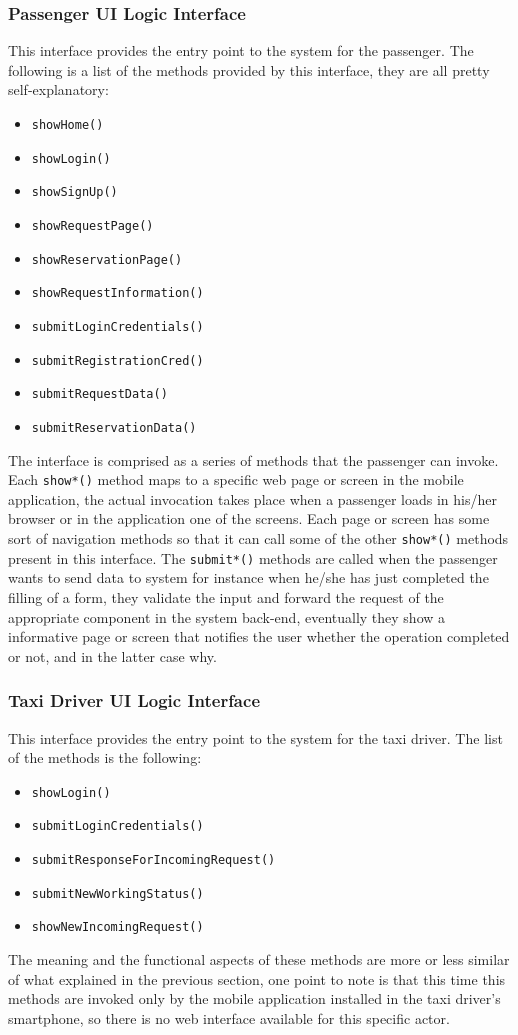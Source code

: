 \subsubsection{Passenger UI Logic Interface}
This interface provides the entry point to the system for the passenger.
The following is a list of the methods provided by this interface, they are all pretty self-explanatory:
\begin{itemize}
	\item \texttt{showHome()}
	\item \texttt{showLogin()}
	\item \texttt{showSignUp()}
	\item \texttt{showRequestPage()}
	\item \texttt{showReservationPage()}
	\item \texttt{showRequestInformation()}
	\item \texttt{submitLoginCredentials()}
	\item \texttt{submitRegistrationCred()}
	\item \texttt{submitRequestData()}
	\item \texttt{submitReservationData()}
\end{itemize}
The interface is comprised as a series of methods that the passenger can invoke. Each \texttt{show*()} method maps to a specific web page or screen in the mobile application, the actual invocation takes place when a passenger loads in his/her browser or in the application one of the screens. Each page or screen has some sort of navigation methods so that it can call some of the other \texttt{show*()} methods present in this interface.
The \texttt{submit*()} methods are called when the passenger wants to send data to system for instance when he/she has just completed the filling of a form, they validate the input and forward the request of the appropriate component in the system back-end, eventually they show a informative page or screen that notifies the user whether the operation completed or not, and in the latter case why. 
\subsubsection{Taxi Driver UI Logic Interface}
This interface provides the entry point to the system for the taxi driver.
The list of the methods is the following:
\begin{itemize}
	\item \texttt{showLogin()}
	\item \texttt{submitLoginCredentials()}
	\item \texttt{submitResponseForIncomingRequest()}
	\item \texttt{submitNewWorkingStatus()}
	\item \texttt{showNewIncomingRequest()}
\end{itemize}
The meaning and the functional aspects of these methods are more or less similar of what explained in the previous section, one point to note is that this time this methods are invoked only by the mobile application installed in the taxi driver's smartphone, so there is no web interface available for this specific actor.
